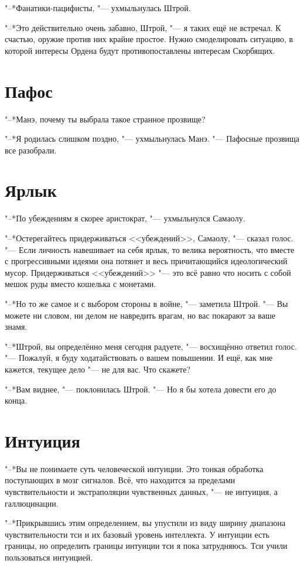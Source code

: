 "--*Фанатики-пацифисты, "--- ухмыльнулась Штрой.

"--*Это действительно очень забавно, Штрой, "--- я таких ещё не встречал.
К счастью, оружие против них крайне простое.
Нужно смоделировать ситуацию, в которой интересы Ордена будут противопоставлены интересам Скорбящих.

\section{Пафос}

"--*Манэ, почему ты выбрала такое странное прозвище?

"--*Я родилась слишком поздно, "--- ухмыльнулась Манэ.
"--- Пафосные прозвища все разобрали.

\section{Ярлык}

"--*По убеждениям я скорее аристократ, "--- ухмыльнулся Самаолу.

"--*Остерегайтесь придерживаться <<убеждений>>, Самаолу, "--- сказал голос.
"--- Если личность навешивает на себя ярлык, то велика вероятность, что вместе с прогрессивными идеями она потянет и весь причитающийся идеологический мусор.
Придерживаться <<убеждений>> "--- это всё равно что носить с собой мешок руды вместо кошелька с монетами.

"--*Но то же самое и с выбором стороны в войне, "--- заметила Штрой.
"--- Вы можете ни словом, ни делом не навредить врагам, но вас покарают за ваше знамя.

"--*Штрой, вы определённо меня сегодня радуете, "--- восхищённо ответил голос.
"--- Пожалуй, я буду ходатайствовать о вашем повышении.
И ещё, как мне кажется, текущее дело "--- не для вас.
Что скажете?

"--*Вам виднее, "--- поклонилась Штрой.
"--- Но я бы хотела довести его до конца.

\section{Интуиция}

"--*Вы не понимаете суть человеческой интуиции.
Это тонкая обработка поступающих в мозг сигналов.
Всё, что находится за пределами чувствительности и экстраполяции чувственных данных, "--- не интуиция, а галлюцинации.

"--*Прикрывшись этим определением, вы упустили из виду ширину диапазона чувствительности тси и их базовый уровень интеллекта.
У интуиции есть границы, но определить границы интуиции тси я пока затрудняюсь.
Тси учили пользоваться интуицией.

